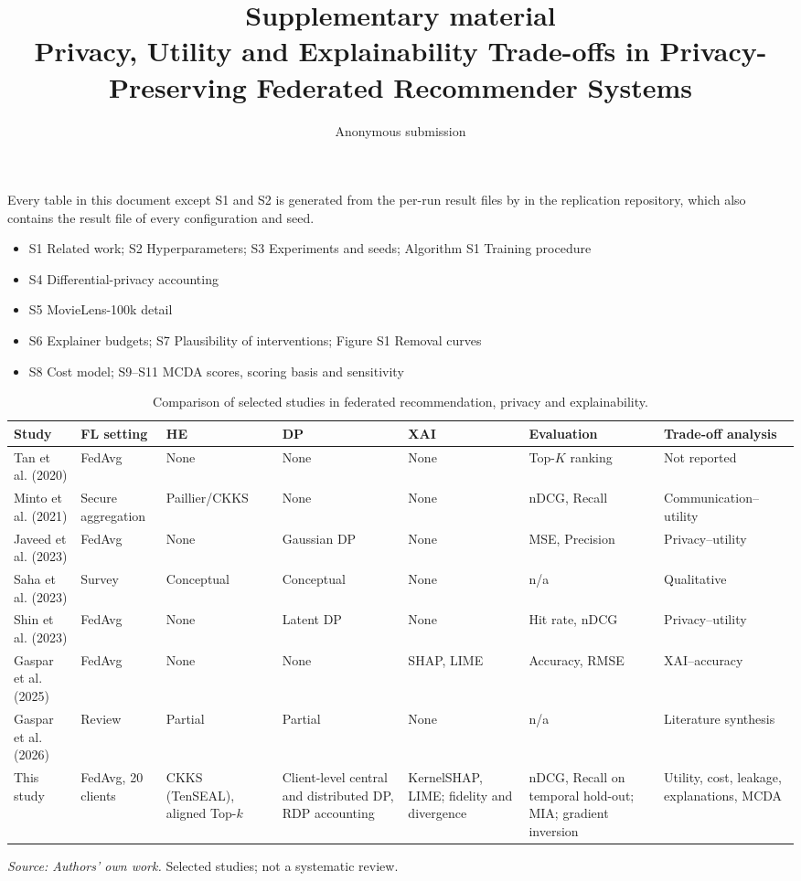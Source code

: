 \documentclass[11pt,a4paper]{article}
\title{\textbf{Supplementary material}\\[0.3em]Privacy, Utility and Explainability Trade-offs in Privacy-Preserving Federated Recommender Systems}
\author{Anonymous submission}
\date{}
\begin{document}
\maketitle

\noindent Every table in this document except S1 and S2 is generated from the per-run result files by  in the replication repository, which also contains the result file of every configuration and seed.

\begin{itemize}
\item S1 Related work; S2 Hyperparameters; S3 Experiments and seeds; Algorithm S1 Training procedure
\item S4 Differential-privacy accounting
\item S5 MovieLens-100k detail
\item S6 Explainer budgets; S7 Plausibility of interventions; Figure S1 Removal curves
\item S8 Cost model; S9--S11 MCDA scores, scoring basis and sensitivity
\end{itemize}

\begin{table}[H]
\centering
\scriptsize
\setlength{\tabcolsep}{2.5pt}
\caption{Comparison of selected studies in federated recommendation, privacy and explainability.}
\label{tab:supp_related_work}
\begin{tabularx}{\textwidth}{>{\raggedright\arraybackslash}p{2.0cm}*{6}{>{\centering\arraybackslash}X}}
\toprule
Study & FL setting & HE & DP & XAI & Evaluation & Trade-off analysis \\
\midrule
Tan et al. (2020) & FedAvg & None & None & None & Top-$K$ ranking & Not reported \\
Minto et al. (2021) & Secure aggregation & Paillier/CKKS & None & None & nDCG, Recall & Communication--utility \\
Javeed et al. (2023) & FedAvg & None & Gaussian DP & None & MSE, Precision & Privacy--utility \\
Saha et al. (2023) & Survey & Conceptual & Conceptual & None & n/a & Qualitative \\
Shin et al. (2023) & FedAvg & None & Latent DP & None & Hit rate, nDCG & Privacy--utility \\
Gaspar et al. (2025) & FedAvg & None & None & SHAP, LIME & Accuracy, RMSE & XAI--accuracy \\
Gaspar et al. (2026) & Review & Partial & Partial & None & n/a & Literature synthesis \\
This study & FedAvg, 20 clients & CKKS (TenSEAL), aligned Top-$k$ & Client-level central and distributed DP, RDP accounting & KernelSHAP, LIME; fidelity and divergence & nDCG, Recall on temporal hold-out; MIA; gradient inversion & Utility, cost, leakage, explanations, MCDA \\
\bottomrule
\end{tabularx}
\par\smallskip\raggedright\footnotesize\textit{Source: Authors' own work.} Selected studies; not a systematic review.
\end{table}
\end{document}

